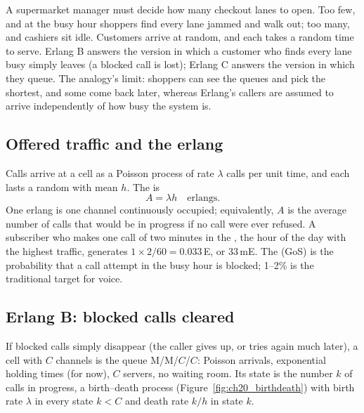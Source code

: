 \begin{analogy}
A supermarket manager must decide how many checkout lanes to open. Too few, and at the busy hour shoppers find
every lane jammed and walk out; too many, and cashiers sit idle. Customers arrive at random, and each takes a
random time to serve. Erlang B answers the version in which a customer who finds every lane busy simply leaves
(a blocked call is lost); Erlang C answers the version in which they queue. The analogy's limit: shoppers can
see the queues and pick the shortest, and some come back later, whereas Erlang's callers are assumed to
arrive independently of how busy the system is.
\end{analogy}


\subsection{Offered traffic and the erlang}

Calls arrive at a cell as a Poisson process of rate $\lambda$ calls per unit time, and each lasts a random
 with mean $h$. The  is
\begin{equation}
A=\lambda h\quad\text{erlangs}.
\end{equation}
One erlang is one channel continuously occupied; equivalently, $A$ is the average number of calls that would be in
progress if no call were ever refused. A subscriber who makes one call of two minutes in the , the
hour of the day with the highest traffic, generates $1\times2/60=0.033$\,E, or 33\,mE. The 
(GoS) is the probability that a call attempt in the busy hour is blocked; 1--2\% is the traditional target for
voice.

\subsection{Erlang B: blocked calls cleared}

If blocked calls simply disappear (the caller gives up, or tries again much later), a cell with $C$ channels is the
queue M/M/$C$/$C$: Poisson arrivals, exponential holding times (for now), $C$ servers, no waiting room. Its state is
the number $k$ of calls in progress, a birth--death process (Figure~\ref{fig:ch20_birthdeath}) with birth rate
$\lambda$ in every state $k<C$ and death rate $k/h$ in state $k$.

